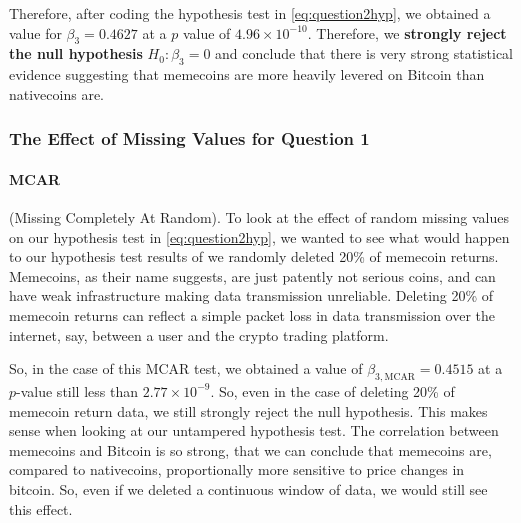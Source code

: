 \documentclass[12pt]{article}
\begin{document}
		Therefore, after coding the hypothesis test in \autoref{eq:question2hyp}, we obtained a value for $\beta_3 = 0.4627$ at a $p$ value of  $4.96 \times 10^{-10}$. Therefore, we \textbf{strongly reject the null hypothesis} $H_0: \beta_3 = 0$ and conclude that there is very strong statistical evidence suggesting that memecoins are more heavily levered on Bitcoin than nativecoins are. 
		\subsubsection{The Effect of Missing Values for Question 1}
		
		\paragraph{MCAR} (Missing Completely At Random). To look at the effect of random missing values on our hypothesis test in \autoref{eq:question2hyp}, we wanted to see what would happen to our hypothesis test results of we randomly deleted 20\% of memecoin returns. Memecoins, as their name suggests, are just patently not serious coins, and can have weak infrastructure making data transmission unreliable. Deleting 20\% of memecoin returns can reflect a simple packet loss in data transmission over the internet, say, between a user and the crypto trading platform.
		
		
		So, in the case of this MCAR test, we obtained a value of $\beta_{3, \mathrm{MCAR}} = 0.4515$ at a $p$-value still less than $2.77 \times 10^{-9}$. So, even in the case of deleting 20\% of memecoin return data, we still strongly reject the null hypothesis. This makes sense when looking at our untampered hypothesis test. The correlation between memecoins and Bitcoin is so strong, that we can conclude that memecoins are, compared to nativecoins, proportionally more sensitive to price changes in bitcoin. So, even if we deleted a continuous window of data, we would still see this effect. 
		
\end{document}
